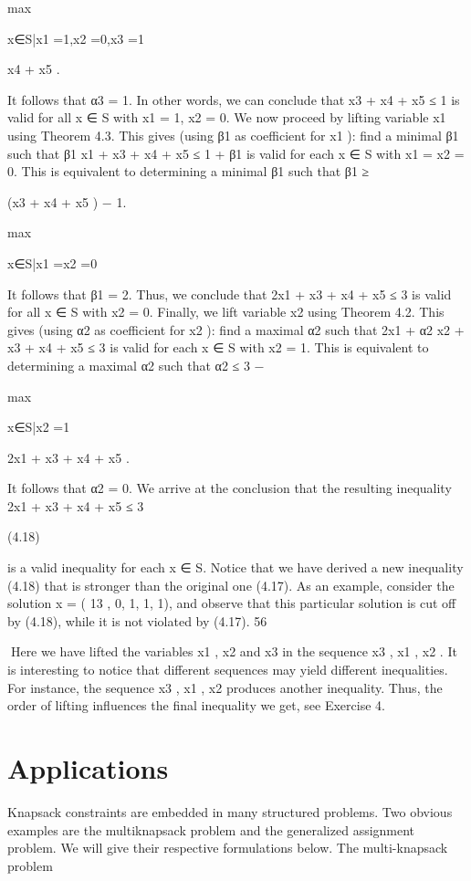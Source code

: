 max

x∈S|x1 =1,x2 =0,x3 =1

x4 + x5 .

It follows that α3 = 1. In other words, we can conclude that x3 + x4 + x5 ≤ 1 is valid for all x ∈ S with
x1 = 1, x2 = 0.
We now proceed by lifting variable x1 using Theorem 4.3. This gives (using β1 as coefficient for x1 ): find
a minimal β1 such that β1 x1 + x3 + x4 + x5 ≤ 1 + β1 is valid for each x ∈ S with x1 = x2 = 0. This is
equivalent to determining a minimal β1 such that
β1 ≥

(x3 + x4 + x5 ) − 1.

max

x∈S|x1 =x2 =0

It follows that β1 = 2. Thus, we conclude that 2x1 + x3 + x4 + x5 ≤ 3 is valid for all x ∈ S with x2 = 0.
Finally, we lift variable x2 using Theorem 4.2. This gives (using α2 as coefficient for x2 ): find a maximal
α2 such that 2x1 + α2 x2 + x3 + x4 + x5 ≤ 3 is valid for each x ∈ S with x2 = 1. This is equivalent to
determining a maximal α2 such that
α2 ≤ 3 −

max

x∈S|x2 =1

2x1 + x3 + x4 + x5 .

It follows that α2 = 0. We arrive at the conclusion that the resulting inequality
2x1 + x3 + x4 + x5 ≤ 3

(4.18)

is a valid inequality for each x ∈ S. Notice that we have derived a new inequality (4.18) that is stronger
than the original one (4.17). As an example, consider the solution x = ( 13 , 0, 1, 1, 1), and observe that
this particular solution is cut off by (4.18), while it is not violated by (4.17).
56

Here we have lifted the variables x1 , x2 and x3 in the sequence x3 , x1 , x2 . It is interesting to notice that
different sequences may yield different inequalities. For instance, the sequence x3 , x1 , x2 produces another
inequality. Thus, the order of lifting influences the final inequality we get, see Exercise 4.

\section{Applications}

Knapsack constraints are embedded in many structured problems. Two obvious examples are the multiknapsack problem and the generalized assignment problem. We will give their respective formulations
below.
The multi-knapsack problem

